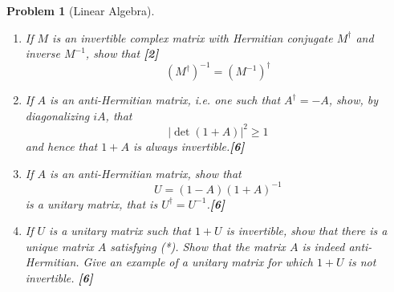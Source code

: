 \documentclass[a4paper]{article}
\theoremstyle{new}
\newtheorem{qns}{Problem}[section]
\begin{document}
\newpage
\begin{qns}[Linear Algebra]\leavevmode
\begin{enumerate}[label=(\roman*)]
\item If $M$ is an invertible complex matrix with Hermitian conjugate $M^\dag$ and inverse $M^{−1}$, show that \hfill \textbf{[2]}
$$(M^\dag)^{−1} = (M^{−1})^\dag$$
\item If $A$ is an anti-Hermitian matrix, i.e. one such that $A^\dag=-A$, show, by diagonalizing $iA$, that
$$|\det(1 + A)|^2\geq1$$
and hence that $1 + A$ is always invertible.\hfill \textbf{[6]}
\item If $A$ is an anti-Hermitian matrix, show that
\begin{equation}
    U = (1 − A)(1 + A)^{-1}\tag{*}
\end{equation}
is a unitary matrix, that is $U^\dag = U^{−1}$.\hfill \textbf{[6]}
\item If $U$ is a unitary matrix such that $1 + U$ is invertible, show that there is a unique matrix $A$ satisfying (*). Show that the matrix $A$ is indeed anti-Hermitian. Give an example of a unitary matrix for which $1 + U$ is not invertible. \hfill \textbf{[6]}
\end{enumerate}
\end{qns}
\end{document}
